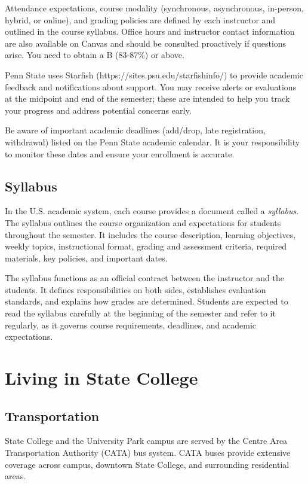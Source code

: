 \documentclass[11pt, oneside]{article}   	%
\begin{document}
Attendance expectations, course modality (synchronous, asynchronous, in-person, hybrid, or online), and grading policies are defined by each instructor and outlined in the course syllabus. Office hours and instructor contact information are also available on Canvas and should be consulted proactively if questions arise. You need to obtain a B (83-87\%) or above.

Penn State uses Starfish (https://sites.psu.edu/starfishinfo/) to provide academic feedback and notifications about support. You may receive alerts or evaluations at the midpoint and end of the semester; these are intended to help you track your progress and address potential concerns early.

Be aware of important academic deadlines (add/drop, late registration, withdrawal) listed on the Penn State academic calendar. It is your responsibility to monitor these dates and ensure your enrollment is accurate.


\subsection{Syllabus}
In the U.S. academic system, each course provides a document called a \textit{syllabus}. The syllabus outlines the course organization and expectations for students throughout the semester. It includes the course description, learning objectives, weekly topics, instructional format, grading and assessment criteria, required materials, key policies, and important dates.

The syllabus functions as an official contract between the instructor and the students. It defines responsibilities on both sides, establishes evaluation standards, and explains how grades are determined. Students are expected to read the syllabus carefully at the beginning of the semester and refer to it regularly, as it governs course requirements, deadlines, and academic expectations.


\section{Living in State College}

\subsection{Transportation}
State College and the University Park campus are served by the Centre Area Transportation Authority (CATA) bus system. CATA buses provide extensive coverage across campus, downtown State College, and surrounding residential areas.
\end{document}
